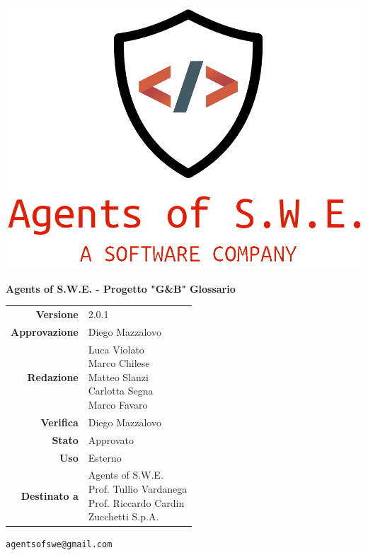 


\begin{titlepage}
\thispagestyle{empty}

\begin{center}

\includegraphics[scale=0.3]{./images/logo.png} 

\large \textbf{Agents of S.W.E. - Progetto "G\&B"}
\vfill
\Huge \textbf{Glossario}
\vfill
\large
\renewcommand{\arraystretch}{1.3}
\begin{tabular}{r|l}
\textbf{Versione} & 2.0.1 \\
\textbf{Approvazione} & Diego Mazzalovo\\
\textbf{Redazione} & \parbox[t]{5cm}{Luca Violato\\Marco Chilese\\Matteo Slanzi\\Carlotta Segna\\ Marco Favaro}\\
\textbf{Verifica} & \parbox[t]{5cm}{Diego Mazzalovo}\\
\textbf{Stato} & Approvato \\
\textbf{Uso} & Esterno\\
\textbf{Destinato a} & \parbox[t]{5cm}{Agents of S.W.E. \\Prof. Tullio Vardanega\\Prof. Riccardo Cardin\\ Zucchetti S.p.A.}
\end{tabular}
\vfill
\small
\texttt{agentsofswe@gmail.com}
\end{center}
\end{titlepage}

